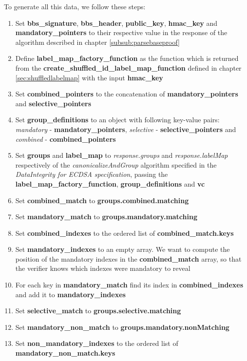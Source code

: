 \documentclass[
	a4paper               %
	,BCOR=0mm            %
	,bibliography=totoc   %
	,listof=totoc         %
	,monolingual
	,twoside=false
]{bfhthesis}              %
\begin{document}
To generate all this data, we follow these steps:
\begin{enumerate}
	\item Set \textbf{bbs\_signature}, \textbf{bbs\_header}, \textbf{public\_key}, \textbf{hmac\_key} and \textbf{mandatory\_pointers} to their respective value in the response of the algorithm described in chapter \ref{subsub:parsebaseproof}
	\item Define \textbf{label\_map\_factory\_function} as the function which is returned from the \textbf{create\_shuffled\_id\_label\_map\_function} defined in chapter \ref{sec:shuffledlabelmap} with the input \textbf{hmac\_key}
	\item Set \textbf{combined\_pointers} to the concatenation of \textbf{mandatory\_pointers} and \textbf{selective\_pointers}
	\item Set \textbf{group\_definitions} to an object with following key-value pairs: \textit{mandatory} - \textbf{mandatory\_pointers}, \textit{selective} - \textbf{selective\_pointers} and \\\textit{combined} - \textbf{combined\_pointers}
	\item Set \textbf{groups} and \textbf{label\_map} to \textit{response.groups} and \textit{response.labelMap} respectively of the \textit{canonicalizeAndGroup} algorithm specified in the \textit{DataIntegrity for ECDSA specification}\cite{ecdsa}, passing the \textbf{label\_map\_factory\_function}, \textbf{group\_definitions} and \textbf{vc}
	\item Set \textbf{combined\_match} to \textbf{groups.combined.matching}
	\item Set \textbf{mandatory\_match} to \textbf{groups.mandatory.matching}
	\item Set \textbf{combined\_indexes} to the ordered list of \textbf{combined\_match.keys}
	\item Set \textbf{mandatory\_indexes} to an empty array. We want to compute the position of the mandatory indexes in the \textbf{combined\_match} array, so that the verifier knows which indexes were mandatory to reveal
	\item For each key in \textbf{mandatory\_match} find its index in \textbf{combined\_indexes} and add it to \textbf{mandatory\_indexes}
	\item Set \textbf{selective\_match} to \textbf{groups.selective.matching}
	\item Set \textbf{mandatory\_non\_match} to \textbf{groups.mandatory.nonMatching}
	\item Set \textbf{non\_mandatory\_indexes} to the ordered list of \textbf{mandatory\_non\_match.keys}

\end{enumerate}
\end{document}
